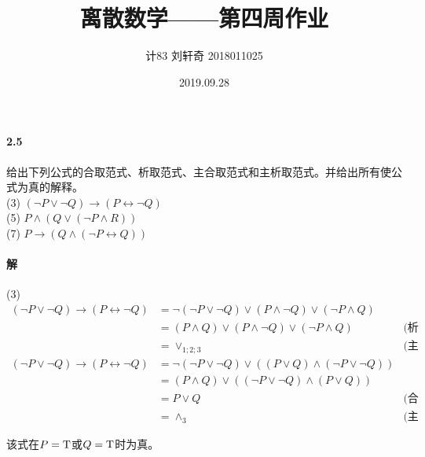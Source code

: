 \documentclass[hyperref, UTF8]{ctexart}
\title{离散数学——第四周作业}
\author{计83  刘轩奇  2018011025}
\date{2019.09.28}
\newcommand{\true}{{\rm T}}
\begin{document}
\maketitle

\paragraph{2.5}\label{2.5}
给出下列公式的合取范式、析取范式、主合取范式和主析取范式。并给出所有使公式为真的解释。\\

(3) $ ( \lnot P \lor \lnot Q) \rightarrow (P \leftrightarrow \lnot Q) $ \\

(5) $ P \land (Q \lor ( \lnot P \land R)) $ \\

(7) $ P \rightarrow (Q \land ( \lnot P \leftrightarrow Q)) $ \\

\paragraph{解}

(3)
\begin{align*}
( \lnot P \lor \lnot Q) \rightarrow (P \leftrightarrow \lnot Q)
    &= \lnot ( \lnot P \lor \lnot Q) \lor (P \land \lnot Q) \lor ( \lnot P \land Q) \\
    &= (P \land Q) \lor (P \land \lnot Q) \lor ( \lnot P \land Q) & \text{(析取范式)} \\
    &= \lor_{1;2;3} & \text{(主析取范式)} \\
( \lnot P \lor \lnot Q) \rightarrow (P \leftrightarrow \lnot Q)
    &= \lnot ( \lnot P \lor \lnot Q) \lor ((P \lor Q) \land ( \lnot P \lor \lnot Q)) \\
    &= (P \land Q) \lor (( \lnot P \lor \lnot Q) \land (P \lor Q)) \\
    &= P \lor Q & \text{(合取范式)}\\
    &= \land _3 & \text{(主合取范式)}
\end{align*}

该式在$P=\true$或$Q=\true$时为真。\\
\end{document}
